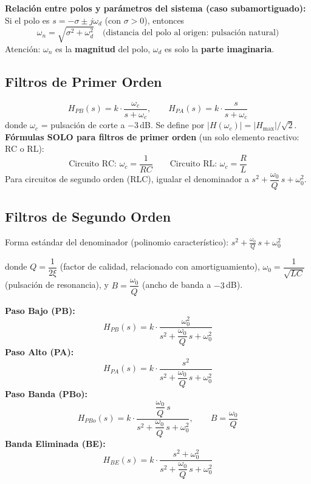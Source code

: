 \documentclass[12pt,a4paper]{article}
\begin{document}
\medskip
\textbf{Relación entre polos y parámetros del sistema (caso subamortiguado):}
Si el polo es $s = -\sigma \pm j\omega_d$ (con $\sigma > 0$), entonces
\[
  \omega_n = \sqrt{\sigma^2 + \omega_d^2} \quad\text{(distancia del polo al origen: pulsación natural)}
\]
Atención: $\omega_n$ es la \textbf{magnitud} del polo, $\omega_d$ es solo la \textbf{parte imaginaria}.

\subsection{Filtros de Primer Orden}

\begin{formulabox}
\[
  H_{PB}(s) = k\cdot\frac{\omega_c}{s+\omega_c}, \qquad
  H_{PA}(s) = k\cdot\frac{s}{s+\omega_c}
\]
donde $\omega_c$ = pulsación de corte a $-3$\,dB. Se define por $|H(\omega_c)| = |H_{\max}|/\sqrt{2}$.\\[4pt]
\textbf{Fórmulas SOLO para filtros de primer orden} (un solo elemento reactivo: RC o RL):
\[
  \text{Circuito RC: }\omega_c = \frac{1}{RC} \qquad \text{Circuito RL: }\omega_c = \frac{R}{L}
\]
Para circuitos de segundo orden (RLC), igualar el denominador a $s^2 + \dfrac{\omega_0}{Q}\,s + \omega_0^2$.
\end{formulabox}

\subsection{Filtros de Segundo Orden}

Forma estándar del denominador (polinomio característico):
$\displaystyle s^2 + \frac{\omega_0}{Q}\,s + \omega_0^2$

donde $Q = \dfrac{1}{2\xi}$ (factor de calidad, relacionado con amortiguamiento),
$\omega_0 = \dfrac{1}{\sqrt{LC}}$ (pulsación de resonancia), y $B = \dfrac{\omega_0}{Q}$ (ancho de banda a $-3$\,dB).

\begin{formulabox}
\textbf{Paso Bajo (PB):}
\[
  H_{PB}(s) = k\cdot
  \frac{\omega_0^2}{s^2 + \dfrac{\omega_0}{Q}\,s + \omega_0^2}
\]
\textbf{Paso Alto (PA):}
\[
  H_{PA}(s) = k\cdot
  \frac{s^2}{s^2 + \dfrac{\omega_0}{Q}\,s + \omega_0^2}
\]
\textbf{Paso Banda (PBo):}
\[
  H_{PBo}(s) = k\cdot
  \frac{\dfrac{\omega_0}{Q}\,s}{s^2 + \dfrac{\omega_0}{Q}\,s + \omega_0^2},
  \qquad B = \frac{\omega_0}{Q}
\]
\textbf{Banda Eliminada (BE):}
\[
  H_{BE}(s) = k\cdot
  \frac{s^2 + \omega_0^2}{s^2 + \dfrac{\omega_0}{Q}\,s + \omega_0^2}
\]
\end{formulabox}
\clearpage %
\end{document}
